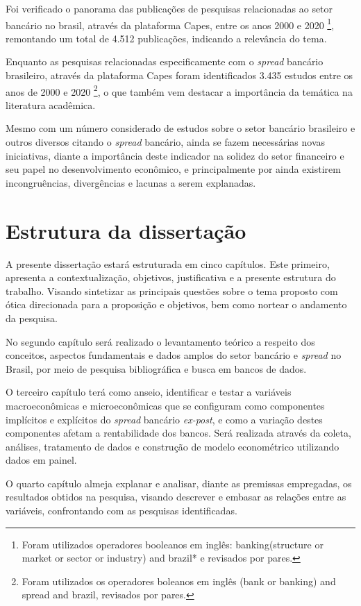 \documentclass[12pt,12pt,openright,oneside,a4paper,chapter=TITLE,section=TITLE,subsection=TITLE,subsubsection=TITLE,english,french,spanish,portugues,sumario=tradicional]{abntex2}
\begin{document}
Foi verificado o panorama das publicações de pesquisas relacionadas ao setor bancário no brasil, através da plataforma Capes, entre os anos 2000 e 2020
\footnote{Foram utilizados operadores booleanos em inglês: banking(structure or
market or sector or industry) and brazil* e revisados por pares.}, remontando um total de 4.512 publicações, indicando a relevância do tema.

Enquanto as pesquisas relacionadas especificamente com o \emph{spread} bancário brasileiro, através da plataforma Capes foram identificados 3.435 estudos entre os anos de 2000 e 2020 \footnote{Foram utilizados os operadores boleanos em
inglês (bank or banking) and spread and brazil, revisados por pares.}, o que também vem destacar a importância da temática na literatura acadêmica.

Mesmo com um número considerado de estudos sobre o setor bancário brasileiro e outros diversos citando o \emph{spread} bancário, ainda se fazem necessárias novas iniciativas, diante a importância deste indicador na solidez do setor financeiro e seu papel no desenvolvimento econômico, e principalmente por ainda existirem incongruências, divergências e lacunas a serem explanadas.

\section{Estrutura da dissertação}

A presente dissertação estará estruturada em cinco capítulos. Este primeiro, apresenta a contextualização, objetivos, justificativa e a presente estrutura do trabalho. Visando sintetizar as principais questões sobre o tema proposto com ótica direcionada para a proposição e objetivos, bem como nortear o andamento da pesquisa.

No segundo capítulo será realizado o levantamento teórico a respeito dos conceitos, aspectos fundamentais e dados amplos do setor bancário e \emph{spread} no Brasil, por meio de pesquisa bibliográfica e busca em bancos de dados.

O terceiro capítulo terá como anseio, identificar e testar a variáveis macroeconômicas e microeconômicas que se configuram como componentes implícitos e explícitos do \emph{spread} bancário \emph{ex-post}, e como a variação destes componentes afetam a rentabilidade dos bancos. Será realizada através da coleta, análises, tratamento de dados e construção de modelo econométrico utilizando dados em painel.

O quarto capítulo almeja explanar e analisar, diante as premissas empregadas, os resultados obtidos na pesquisa, visando descrever e embasar as relações entre as variáveis, confrontando com as pesquisas identificadas.
\end{document}
